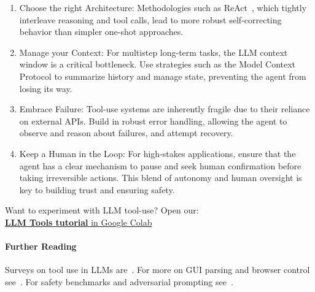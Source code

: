 \begin{enumerate}
    \item Choose the right Architecture: Methodologies such as ReAct~\citep{yao2022react}, which tightly interleave reasoning and tool calls, lead to more robust self-correcting behavior than simpler one-shot approaches.
    \item Manage your Context: For multistep long-term tasks, the LLM context window is a critical bottleneck. Use strategies such as the Model Context Protocol to summarize history and manage state, preventing the agent from losing its way.
    \item Embrace Failure: Tool-use systems are inherently fragile due to their reliance on external APIs. Build in robust error handling, allowing the agent to observe and reason about failures, and attempt recovery.
    \item Keep a Human in the Loop: For high-stakes applications, ensure that the agent has a clear mechanism to pause and seek human confirmation before taking irreversible actions. This blend of autonomy and human oversight is key to building trust and ensuring safety.
\end{enumerate}

\begin{tcolorbox}[
    colback=blue!10!white,
    colframe=blue!85!black,
    title={\faRocket\quad Try it yourself!},
    fonttitle=\bfseries,
    coltitle=white,
    boxrule=1pt,
    arc=4pt,
    left=5pt,
    right=5pt,
    top=5pt,
    bottom=5pt,
    enhanced
]
Want to experiment with LLM tool-use?  
Open our:\\ 
\href{https://colab.research.google.com/github/Agentic-LLMs/Agentic-AI-tutorials/blob/main/tools_tutorial.ipynb}{\faCode\quad \textbf{LLM Tools tutorial} in Google Colab}
\end{tcolorbox}

\paragraph{Further Reading}
Surveys on tool use in LLMs are~\citet{shen2024llm,patil2023gorillalargelanguagemodel,qin2023toolllm}. 
For more on GUI parsing and browser control see~\citet{lu2024omniparserpurevisionbased,browser_use2024}. For 
safety benchmarks and adversarial prompting see~\citet{wang2025comprehensive}.



